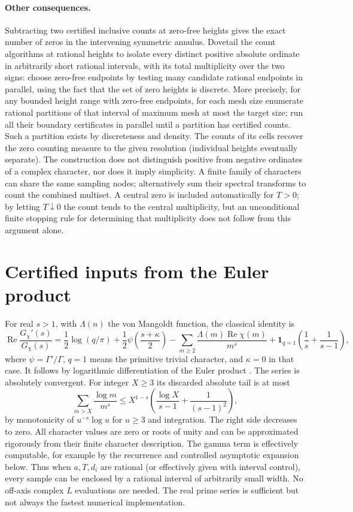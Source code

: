 \documentclass[11pt]{article}
\theoremstyle{remark}\newtheorem{remark}[theorem]{Remark}
\newcommand{\Rea}{\operatorname{Re}}
\newcommand{\one}{\mathbf 1}
\begin{document}
\paragraph{Other consequences.} Subtracting two certified inclusive counts at zero-free heights gives the exact number of zeros in the intervening symmetric annulus. Dovetail the count algorithms at rational heights to isolate every distinct positive absolute ordinate in arbitrarily short rational intervals, with its total multiplicity over the two signs: choose zero-free endpoints by testing many candidate rational endpoints in parallel, using the fact that the set of zero heights is discrete. More precisely, for any bounded height range with zero-free endpoints, for each mesh size enumerate rational partitions of that interval of maximum mesh at most the target size; run all their boundary certificates in parallel until a partition has certified counts. Such a partition exists by discreteness and density. The counts of its cells recover the zero counting measure to the given resolution (individual heights eventually separate). The construction does not distinguish positive from negative ordinates of a complex character, nor does it imply simplicity. A finite family of characters can share the same sampling nodes; alternatively sum their spectral transforms to count the combined multiset. A central zero is included automatically for $T>0$; by letting $T\downarrow0$ the count tends to the central multiplicity, but an unconditional finite stopping rule for determining that multiplicity does not follow from this argument alone.

\section{Certified inputs from the Euler product}
For real $s>1$, with $\Lambda(n)$ the von Mangoldt function, the classical identity is
\begin{equation}\label{eq:euler}
 \Rea\frac{G_\chi'(s)}{G_\chi(s)}=
 \frac12\log(q/\pi)+\frac12\psi\!\left(\frac{s+\kappa}{2}\right)
 -\sum_{m\ge2}\frac{\Lambda(m)\Rea\chi(m)}{m^s}
 +\one_{q=1}\left(\frac1s+\frac1{s-1}\right),
\end{equation}
where $\psi=\Gamma'/\Gamma$, $q=1$ means the primitive trivial character, and $\kappa=0$ in that case. It follows by logarithmic differentiation of the Euler product \cite{dlmf,chirre}. The series is absolutely convergent. For integer $X\ge3$ its discarded absolute tail is at most
\[
 \sum_{m>X}\frac{\log m}{m^s}\le
 X^{1-s}\left(\frac{\log X}{s-1}+\frac{1}{(s-1)^2}\right),
\]
by monotonicity of $u^{-s}\log u$ for $u\ge3$ and integration. The right side decreases to zero. All character values are zero or roots of unity and can be approximated rigorously from their finite character description. The gamma term is effectively computable, for example by the recurrence and controlled asymptotic expansion below. Thus when $a,T,d_i$ are rational (or effectively given with interval control), every sample can be enclosed by a rational interval of arbitrarily small width. No off-axis complex $L$ evaluations are needed. The real prime series is sufficient but not always the fastest numerical implementation.
\end{document}
